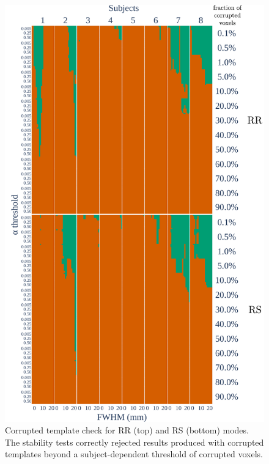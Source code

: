 \documentclass[lettersize,journal]{IEEEtran}
\begin{document}
\begin{figure}
    \centering
    \includegraphics[width=\linewidth]{figures/template/template_fwe_bonferroni.pdf}
    \caption{Corrupted template check for RR (top) and RS (bottom) modes. The stability tests correctly rejected results produced with corrupted templates beyond a subject-dependent threshold of corrupted voxels.}
    \label{fig:template_bonferroni}
\end{figure}

\end{document}
